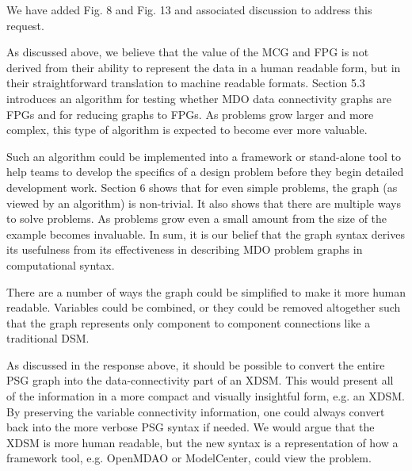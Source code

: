 \documentclass{aiaa-tc}
\begin{document}
We have added  Fig. 8 and Fig. 13 and associated discussion to address this request.



As discussed above, we believe that the value of the MCG and FPG is not derived from their ability to represent the data in a human readable 
form, but in their straightforward translation to machine readable formats. Section 5.3 introduces an 
algorithm for testing whether MDO data connectivity graphs are FPGs and for reducing graphs to FPGs. As problems grow larger and more complex, 
this type of algorithm is expected to become ever more valuable. 

Such an algorithm could be implemented into a framework or stand-alone tool to help teams to develop the
specifics of a design problem before they begin detailed development work. 
Section 6 shows that for even simple problems, the graph (as viewed by an algorithm) is 
non-trivial. It also shows that there are multiple ways to solve problems. As 
problems grow even a small amount from the size of the example becomes invaluable. In sum, it is our belief that the graph syntax derives its usefulness from 
its effectiveness in describing MDO problem graphs in computational syntax. 


There are a number of ways the graph could be simplified to make it more human readable. Variables could be combined, or they could be removed altogether such that the graph represents only component to component connections like a traditional DSM. 

As discussed in the response above, it should be possible to convert the entire PSG graph into the data-connectivity part of an XDSM. This would present all of the information in a more compact and visually insightful form, e.g. an XDSM. By preserving the variable connectivity information, one could always convert back into the more verbose PSG syntax  if needed.  We would argue that the XDSM is more human readable, but the new syntax is a representation of how a framework tool, e.g. OpenMDAO or ModelCenter, could view the problem. 
\end{document}
